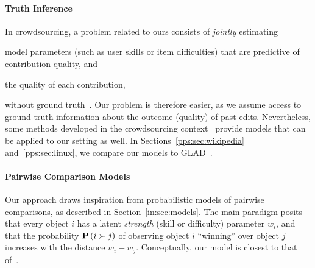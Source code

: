 \paragraph{Truth Inference}
In crowdsourcing, a problem related to ours consists of \emph{jointly} estimating
\begin{enuminline}
	\item model parameters (such as user skills or item difficulties) that are predictive of contribution quality, and
	\item the quality of each contribution,
\end{enuminline}
without ground truth~\citep{dawid1979maximum}.
Our problem is therefore easier, as we assume access to ground-truth information about the outcome (quality) of past edits.
Nevertheless, some methods developed in the crowdsourcing context~\citep{whitehill2009whose, welinder2010multidimensional, zhou2012learning} provide models that can be applied to our setting as well.
In Sections~\ref{pps:sec:wikipedia} and~\ref{pps:sec:linux}, we compare our models to GLAD~\citep{whitehill2009whose}.


\paragraph{Pairwise Comparison Models}
Our approach draws inspiration from probabilistic models of pairwise comparisons, as described in Section~\ref{in:sec:models}.
The main paradigm posits that every object $i$ has a latent \emph{strength} (skill or difficulty) parameter $w_i$, and that the probability $\mathbf{P}\left( i \succ j \right)$ of observing object $i$ ``winning'' over object $j$ increases with the distance $w_i - w_j$.
Conceptually, our model is closest to that of~\citet{rasch1960probabilistic}.

